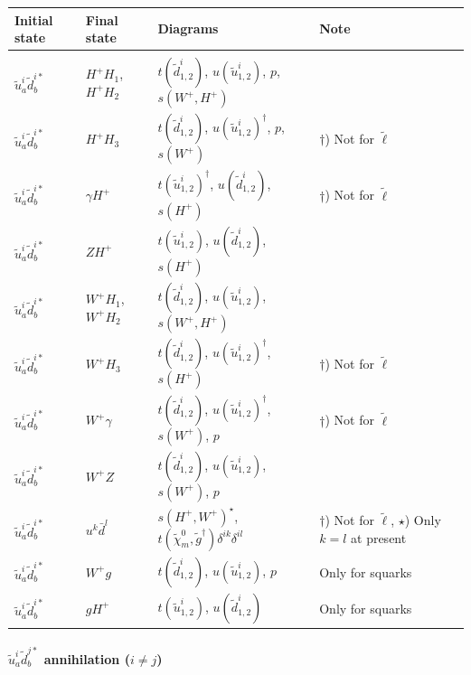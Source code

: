 \documentclass[a4paper,10pt,oneside]{book}
\newcommand{\tabspace}{\\[-2.5ex]}
\begin{document}
\begin{center}
\begin{tabular}{llll} \hline
{\bfseries Initial state} & {\bfseries Final state} &
{\bfseries Diagrams} & {\bfseries Note} \\ \hline \tabspace
$\tilde{u}^i_a \tilde{d}^{i*}_b$ & $H^+ H_1$, $H^+ H_2$ &
$t(\tilde{d}^i_{1,2})$, $u(\tilde{u}^i_{1,2})$, $p$, $s(W^+,H^+)$  \\
$\tilde{u}^i_a \tilde{d}^{i*}_b$ & $H^+ H_3$ &
$t(\tilde{d}^i_{1,2})$, $u(\tilde{u}^i_{1,2})^\dagger$, $p$, $s(W^+)$ 
& $\dagger$) Not for $\tilde{\ell}$ \\
$\tilde{u}^i_a \tilde{d}^{i*}_b$ & $\gamma H^+$ &
$t(\tilde{u}^i_{1,2})^\dagger$, $u(\tilde{d}^i_{1,2})$, $s(H^+)$ 
& $\dagger$) Not for $\tilde{\ell}$ \\
$\tilde{u}^i_a \tilde{d}^{i*}_b$ & $Z H^+$ &
$t(\tilde{u}^i_{1,2})$, $u(\tilde{d}^i_{1,2})$, $s(H^+)$ \\
$\tilde{u}^i_a \tilde{d}^{i*}_b$ & $W^+ H_1$, $W^+ H_2$  &
$t(\tilde{d}^i_{1,2})$, $u(\tilde{u}^i_{1,2})$, $s(W^+,H^+)$ \\
$\tilde{u}^i_a \tilde{d}^{i*}_b$ & $W^+ H_3$  &
$t(\tilde{d}^i_{1,2})$, $u(\tilde{u}^i_{1,2})^\dagger$, $s(H^+)$ 
& $\dagger$) Not for $\tilde{\ell}$ \\
$\tilde{u}^i_a \tilde{d}^{i*}_b$ & $W^+ \gamma$  &
$t(\tilde{d}^i_{1,2})$, $u(\tilde{u}^i_{1,2})^\dagger$, $s(W^+)$, $p$ 
& $\dagger$) Not for $\tilde{\ell}$ \\
$\tilde{u}^i_a \tilde{d}^{i*}_b$ & $W^+ Z$  &
$t(\tilde{d}^i_{1,2})$, $u(\tilde{u}^i_{1,2})$, $s(W^+)$, $p$ \\
$\tilde{u}^i_a \tilde{d}^{i*}_b$ & $u^k \bar{d}^l$ &
$s(H^+,W^+)^\star$, $t(\tilde{\chi}_m^0,\tilde{g}^\dagger)\delta^{ik}\delta^{il}$ 
& \parbox[t]{4cm}{$\dagger$) Not for $\tilde{\ell}$, $\star$) Only $k=l$ at present} \\ 
$\tilde{u}^i_a \tilde{d}^{i*}_b$ & $W^+ g$ &
$t(\tilde{d}^i_{1,2})$, $u(\tilde{u}^i_{1,2})$, $p$
& Only for squarks \\ 
$\tilde{u}^i_a \tilde{d}^{i*}_b$ & $g H^+$ &
$t(\tilde{u}^i_{1,2})$, $u(\tilde{d}^i_{1,2})$
& Only for squarks \\ \hline
\end{tabular}
\end{center}

\paragraph{$\tilde{u}_a^i \tilde{d}_{b}^{j*}$ annihilation ($i \ne j$)}
\end{document}
